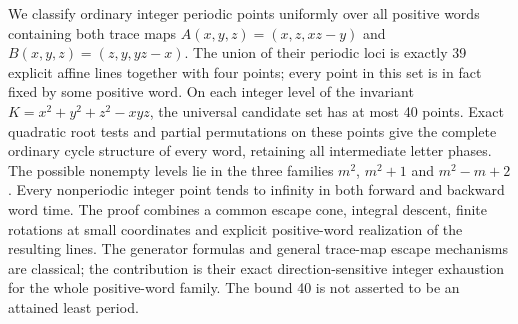 We classify ordinary integer periodic points uniformly over all positive
words containing both trace maps $A(x,y,z)=(x,z,xz-y)$ and
$B(x,y,z)=(z,y,yz-x)$. The union of their periodic loci is exactly
39 explicit affine lines together with four points; every point in
this set is in fact fixed by some positive word. On each integer
level of the invariant $K=x^2+y^2+z^2-xyz$, the universal candidate
set has at most 40 points. Exact quadratic root tests and partial
permutations on these points give the complete ordinary cycle
structure of every word, retaining all intermediate letter phases.
The possible nonempty levels lie in the three families $m^2$,
$m^2+1$ and $m^2-m+2$. Every nonperiodic integer point tends to
infinity in both forward and backward word time. The proof combines
a common escape cone, integral descent, finite rotations at small
coordinates and explicit positive-word realization of the resulting
lines. The generator formulas and general trace-map escape mechanisms
are classical; the contribution is their exact direction-sensitive
integer exhaustion for the whole positive-word family. The bound
40 is not asserted to be an attained least period.
